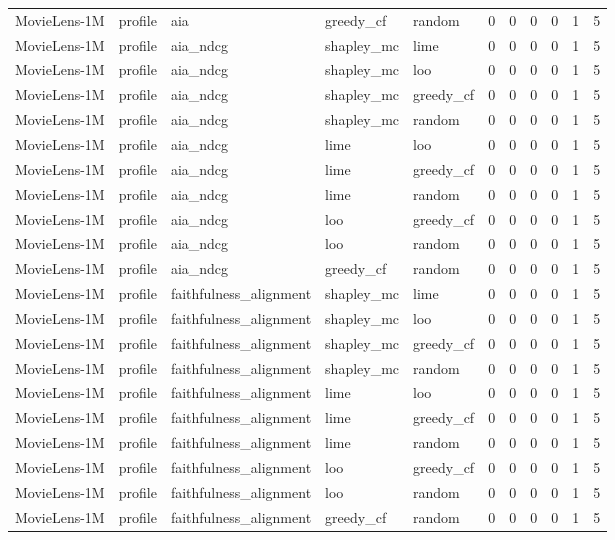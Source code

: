 \begin{table}[t]
{\begin{tabular}{lllllrrrrrr}
MovieLens-1M & profile & aia & greedy\_cf & random & 0 & 0 & 0 & 0 & 1 & 5 \\
MovieLens-1M & profile & aia\_ndcg & shapley\_mc & lime & 0 & 0 & 0 & 0 & 1 & 5 \\
MovieLens-1M & profile & aia\_ndcg & shapley\_mc & loo & 0 & 0 & 0 & 0 & 1 & 5 \\
MovieLens-1M & profile & aia\_ndcg & shapley\_mc & greedy\_cf & 0 & 0 & 0 & 0 & 1 & 5 \\
MovieLens-1M & profile & aia\_ndcg & shapley\_mc & random & 0 & 0 & 0 & 0 & 1 & 5 \\
MovieLens-1M & profile & aia\_ndcg & lime & loo & 0 & 0 & 0 & 0 & 1 & 5 \\
MovieLens-1M & profile & aia\_ndcg & lime & greedy\_cf & 0 & 0 & 0 & 0 & 1 & 5 \\
MovieLens-1M & profile & aia\_ndcg & lime & random & 0 & 0 & 0 & 0 & 1 & 5 \\
MovieLens-1M & profile & aia\_ndcg & loo & greedy\_cf & 0 & 0 & 0 & 0 & 1 & 5 \\
MovieLens-1M & profile & aia\_ndcg & loo & random & 0 & 0 & 0 & 0 & 1 & 5 \\
MovieLens-1M & profile & aia\_ndcg & greedy\_cf & random & 0 & 0 & 0 & 0 & 1 & 5 \\
MovieLens-1M & profile & faithfulness\_alignment & shapley\_mc & lime & 0 & 0 & 0 & 0 & 1 & 5 \\
MovieLens-1M & profile & faithfulness\_alignment & shapley\_mc & loo & 0 & 0 & 0 & 0 & 1 & 5 \\
MovieLens-1M & profile & faithfulness\_alignment & shapley\_mc & greedy\_cf & 0 & 0 & 0 & 0 & 1 & 5 \\
MovieLens-1M & profile & faithfulness\_alignment & shapley\_mc & random & 0 & 0 & 0 & 0 & 1 & 5 \\
MovieLens-1M & profile & faithfulness\_alignment & lime & loo & 0 & 0 & 0 & 0 & 1 & 5 \\
MovieLens-1M & profile & faithfulness\_alignment & lime & greedy\_cf & 0 & 0 & 0 & 0 & 1 & 5 \\
MovieLens-1M & profile & faithfulness\_alignment & lime & random & 0 & 0 & 0 & 0 & 1 & 5 \\
MovieLens-1M & profile & faithfulness\_alignment & loo & greedy\_cf & 0 & 0 & 0 & 0 & 1 & 5 \\
MovieLens-1M & profile & faithfulness\_alignment & loo & random & 0 & 0 & 0 & 0 & 1 & 5 \\
MovieLens-1M & profile & faithfulness\_alignment & greedy\_cf & random & 0 & 0 & 0 & 0 & 1 & 5 \\

\end{tabular}}
\end{table}
